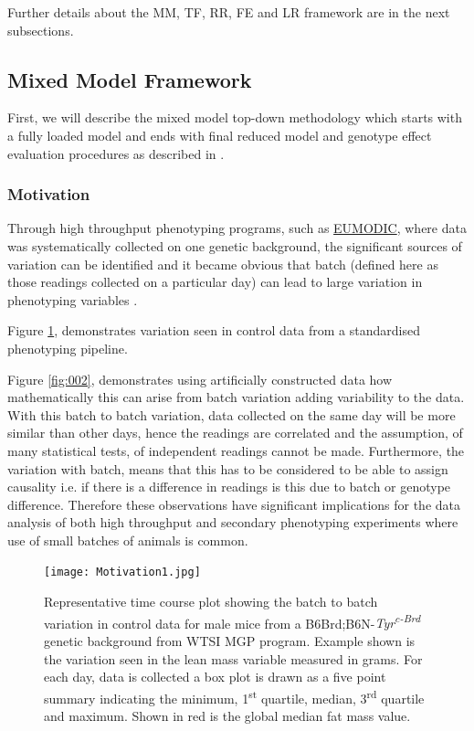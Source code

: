 \documentclass[12pt,a4paper]{article}
\begin{document}
Further details about the MM, TF, RR, FE and LR framework are in the next subsections.

\subsection{Mixed Model Framework}
First, we will describe the mixed model top-down methodology which starts with a fully loaded model and ends with final reduced model and genotype effect evaluation procedures as described in \cite{MM07}. 

\subsubsection{Motivation}
Through high throughput phenotyping programs, such as \href{http://www.eumodic.org/}{EUMODIC}, where data was systematically collected on one genetic background, the significant sources of variation can be identified and it became obvious that batch (defined here as those readings collected on a particular day) can lead to large variation in phenotyping variables \cite{MM12}.  

Figure \ref{fig:001}, demonstrates variation seen in control data from a standardised phenotyping pipeline. 

Figure \ref{fig:002}, demonstrates using artificially constructed data how mathematically this can arise from batch variation adding variability to the data. With this batch to batch variation, data collected on the same day will be more similar than other days, hence the readings are correlated and the assumption, of many statistical tests, of independent readings cannot be made.  Furthermore, the variation with batch, means that this has to be considered to be able to assign causality i.e. if there is a difference in readings is this due to batch or genotype difference.  Therefore these observations have significant implications for the data analysis of both high throughput and secondary phenotyping experiments where use of small batches of animals is common. 

\begin{figure}[!htpb]%
\centerline{\texttt{[image: Motivation1.jpg]}}
\caption{Representative time course plot showing the batch to batch variation in control data for male mice from a B6Brd;B6N-\textit{Tyr\textsuperscript{c-Brd}} genetic background from WTSI MGP program. Example shown is the variation seen in the lean mass variable measured in grams.   For each day, data is collected a box plot is drawn as a five point summary indicating the minimum, 1\textsuperscript{st} quartile, median, 3\textsuperscript{rd} quartile and maximum. Shown in red is the global median fat mass value.}\label{fig:001}
\end{figure}
\end{document}

